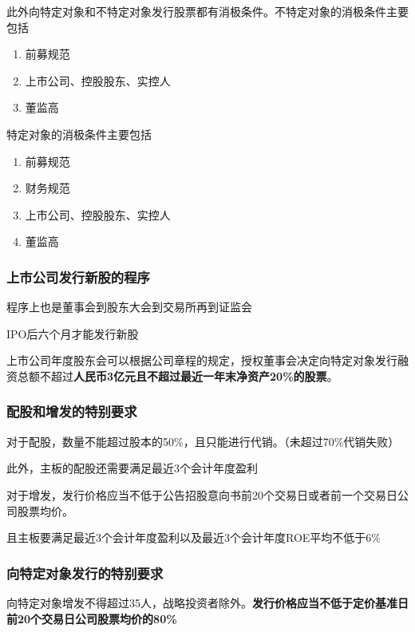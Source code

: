 \documentclass[UTF8,12pt]{ctexart}
\numberwithin{equation}{section} %
\numberwithin{figure}{section}
\numberwithin{table}{section}
\begin{document}
	此外向特定对象和不特定对象发行股票都有消极条件。不特定对象的消极条件主要包括
	\begin{enumerate}
		\item 前募规范
		
		\item 上市公司、控股股东、实控人
		
		\item 董监高
	\end{enumerate}
	特定对象的消极条件主要包括
	\begin{enumerate}
		\item 前募规范
		
		\item 财务规范
		
		\item 上市公司、控股股东、实控人
		
		\item 董监高
	\end{enumerate}
	
	\subsubsection{上市公司发行新股的程序}
	程序上也是董事会到股东大会到交易所再到证监会
	
	IPO后六个月才能发行新股
	
	上市公司年度股东会可以根据公司章程的规定，授权董事会决定向特定对象发行融资总额不超过\textbf{人民币3亿元且不超过最近一年末净资产20\%的股票}。
	
	\subsubsection{配股和增发的特别要求}
	对于配股，数量不能超过股本的50\%，且只能进行代销。（未超过70\%代销失败）
	
	此外，主板的配股还需要满足最近3个会计年度盈利
	
	对于增发，发行价格应当不低于公告招股意向书前20个交易日或者前一个交易日公司股票均价。
	
	且主板要满足最近3个会计年度盈利以及最近3个会计年度ROE平均不低于6\%
	
	\subsubsection{向特定对象发行的特别要求}
	
	向特定对象增发不得超过35人，战略投资者除外。\textbf{发行价格应当不低于定价基准日前20个交易日公司股票均价的80\%}
	
\end{document}
